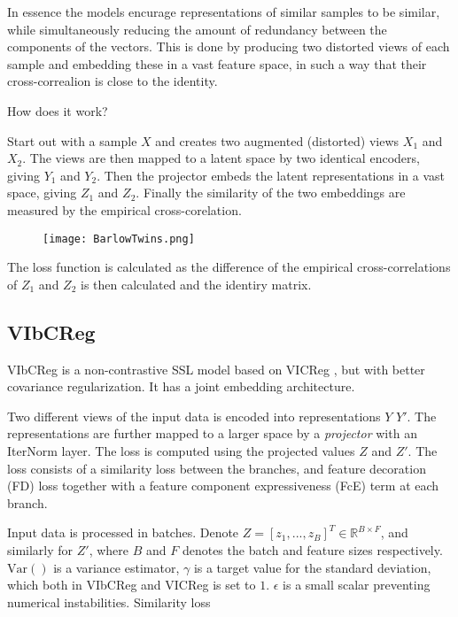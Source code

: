 \documentclass[../../thesis.tex]{subfiles}
\begin{document}
In essence the models encurage representations of similar samples to be similar, while simultaneously reducing the amount of redundancy between the components of the vectors. This is done by producing two distorted views of each sample and embedding these in a vast feature space, in such a way that their cross-correalion is close to the identity. 

How does it work?

Start out with a sample $X$ and creates two augmented (distorted) views $X_1$ and $X_2$. The views are then mapped to a latent space by two identical encoders, giving $Y_1$ and $Y_2$. Then the projector embeds the latent representations in a vast space, giving $Z_1$ and $Z_2$. Finally the similarity of the two embeddings are measured by the empirical cross-corelation.

\begin{figure}[h]
    \texttt{[image: BarlowTwins.png]}
    \centering    
    \caption{\cite{zbontar2021barlow}}
\end{figure}

The loss function is calculated as the difference of the empirical cross-correlations of $Z_1$ and $Z_2$ is then calculated and the identiry matrix. 


\subsection{VIbCReg}

VIbCReg \cite{lee2024vibcreg} is a non-contrastive SSL model based on VICReg \cite{bardes2022vicreg}, but with better covariance regularization.  It has a joint embedding architecture. 

Two different views of the input data is encoded into representations $Y$ $Y'$. The representations are further mapped to a larger space by a \textit{projector} with an IterNorm \cite{huang2019iterative} layer. The loss is computed using the projected values $Z$ and $Z'$. \newline
The loss consists of a similarity loss between the branches, and feature decoration (FD) loss together with a feature component expressiveness (FcE) term at each branch. 

Input data is processed in batches. Denote $Z = [z_1,...,z_B]^T \in \mathbb{R}^{B\times F}$, and similarly for $Z'$, where $B$ and $F$ denotes the batch and feature sizes respectively. $\text{Var}()$ is a variance estimator, $\gamma$ is a target value for the standard deviation, which both in VIbCReg and VICReg is set to $1$. $\epsilon$ is a small scalar preventing numerical instabilities.\newline 
Similarity loss
\end{document}
